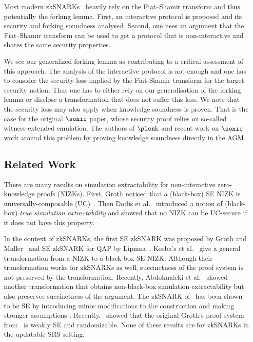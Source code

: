 Most modern zkSNARKs~\cite{SP:BBBPWM18,CCS:MBKM19} heavily
rely on the Fiat--Shamir transform and thus potentially the forking lemma. First, an interactive
protocol is proposed and its security and forking soundness analysed. Second,
one uses an argument that the Fiat--Shamir transform can be used to get a
protocol that is non-interactive and shares the same security properties.

We see our generalized forking lemma as contributing to a critical assessment of
this approach. The analysis of the interactive protocol is not enough and one
has to consider the security loss implied by the Fiat-Shamir transform for the target security notion. Thus one has to either rely on our generalisation of the forking
lemma or disclose a transformation that does not suffer this loss. We note that
the security loss may also apply when knowledge soundness is proven. That is the
case for the original $\sonic$ paper, whose security proof relies on so-called witness-extended
emulation. The authors of $\plonk$ and recent work on $\sonic$~\cite{cryptoeprint:2020:1351} work around this problem by proving
knowledge soundness directly in the AGM.



\subsection{Related Work}
 

There are many results on simulation extractability for
non-interactive zero-knowledge proofs (NIZKs). First, Groth \cite{AC:Groth07}
noticed that a (black-box) SE NIZK is
universally-composable (UC)~\cite{EPRINT:Canetti00}. Then Dodis et al.~\cite{AC:DHLW10} introduced a
notion of (black-box) \emph{true simulation extractability} and showed that no
NIZK can be UC-secure if it does not have this property. 

In the context of zkSNARKs, the first
SE zkSNARK was proposed by Groth and Maller~\cite{C:GroMal17} and SE
zkSNARK for QAP by Lipmaa~\cite{EPRINT:Lipmaa19a}. 
Kosba's et
al.~\cite{EPRINT:KZMQCP15} give a general transformation from a NIZK to a
black-box SE NIZK. Although their transformation works for zkSNARKs as well,
succinctness of the proof system is not preserved by the transformation.
Recently, Abdolmaleki et al.~\cite{CCS:AbdRamSla20} showed another transformation that
obtains non-black-box simulation extractability but also preserves
succinctness of the argument. 
The zkSNARK of~\cite{EC:Groth16} has been shown to be SE by introducing minor modifications to the construction and making
stronger assumptions \cite{EPRINT:BowGab18,EPRINT:AtaBag19}. Recently,~\cite{EPRINT:BKSV20} showed that the
original Groth's proof system from~\cite{EC:Groth16} is weakly SE and
randomizable. None of these results are for zkSNARKs in the updatable SRS setting.

